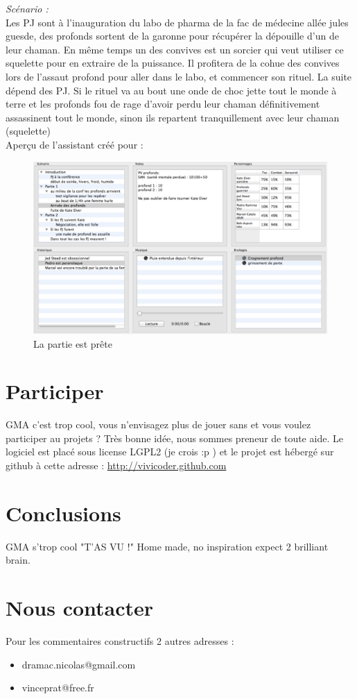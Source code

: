 \documentclass[12pt]{article}
\begin{document}
\emph{Scénario :}\\ 
Les PJ sont à l'inauguration du labo de pharma de la fac de médecine allée jules guesde, des profonds sortent de la garonne pour récupérer la dépouille d'un de leur chaman.
En même temps un des convives est un sorcier qui veut utiliser ce squelette pour en extraire de la puissance. Il profitera de la cohue des convives lors de l'assaut profond pour aller dans le labo, et commencer son rituel. La suite dépend des PJ. Si le rituel va au bout une onde de choc jette tout le monde à terre et les profonds fou de rage d'avoir perdu leur chaman définitivement assassinent tout le monde, sinon ils repartent tranquillement avec leur chaman (squelette)
\\
Aperçu de l'assistant créé pour :
\begin{figure}
    \includegraphics[scale=0.20]{screen_scenar_exemple}
    \caption{La partie est prête}
\end{figure}

\section{Participer}\label{participer}
GMA c'est trop cool, vous n'envisagez plus de jouer sans et vous voulez participer au projets ?
Très bonne idée, nous sommes preneur de toute aide.
Le logiciel est placé sous license LGPL2 (je crois :p ) et le projet est hébergé sur github à cette adresse :
\underline{http://vivicoder.github.com}

\section{Conclusions}\label{conclusions}
GMA s'trop cool "T'AS VU !"
Home made, no inspiration expect 2 brilliant brain.

\section*{Nous contacter}
Pour les commentaires constructifs 2 autres adresses :
\begin{itemize}
    \item dramac.nicolas@gmail.com
    \item vinceprat@free.fr
\end{itemize}
\end{document}
